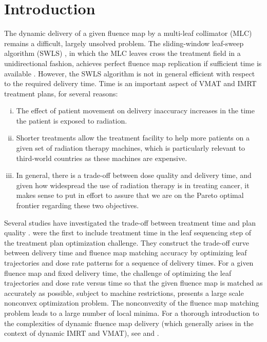 \documentclass[12pt]{article}
\begin{document}
\section{Introduction}
The dynamic delivery of a given fluence map by a multi-leaf collimator (MLC) remains a difficult, largely unsolved problem.
The sliding-window leaf-sweep algorithm (SWLS) \cite{leafsweep},
    in which the MLC leaves cross the treatment field in a unidirectional fashion,
    achieves perfect fluence map replication if sufficient time is available \cite{Stein94}.
However, the SWLS algorithm is not in general efficient with respect to the required delivery time.
Time is an important aspect of VMAT and IMRT treatment plans, for several reasons:
\begin{enumerate}[i)]
  \item The effect of patient movement on delivery inaccuracy increases in the time the patient is exposed to radiation.
  \item Shorter treatments allow the treatment facility to help more patients on a given set of radiation therapy machines,
        which is particularly relevant to third-world countries as these machines are expensive.
  \item In general, there is a trade-off between dose quality and delivery time, and given how widespread the use of radiation therapy is in treating cancer, it makes sense to put in effort to assure that we are on the Pareto optimal frontier regarding these two objectives.

\end{enumerate}
Several studies have investigated the trade-off between treatment time and plan quality \cite{tradeoffSalari,tradeoffMCO,tradeoffCraft}.
\cite{balvertcraft} were the first to include treatment time in the leaf sequencing step of the treatment plan optimization challenge.
They construct the trade-off curve between delivery time and fluence map matching accuracy by optimizing leaf trajectories and dose rate patterns for a sequence of delivery times.
For a given fluence map and fixed delivery time, the challenge of optimizing the leaf trajectories and dose rate versus time so that the given fluence map is matched as accurately as possible, subject to machine restrictions, presents a large scale nonconvex optimization problem.
The nonconvexity of the fluence map matching problem leads to a large number of local minima.
For a thorough introduction to the complexities of dynamic fluence map delivery (which generally arises in the context of dynamic IMRT and VMAT),
 see \cite{balvertcraft} and \cite{unkvmatreview}.
\end{document}
